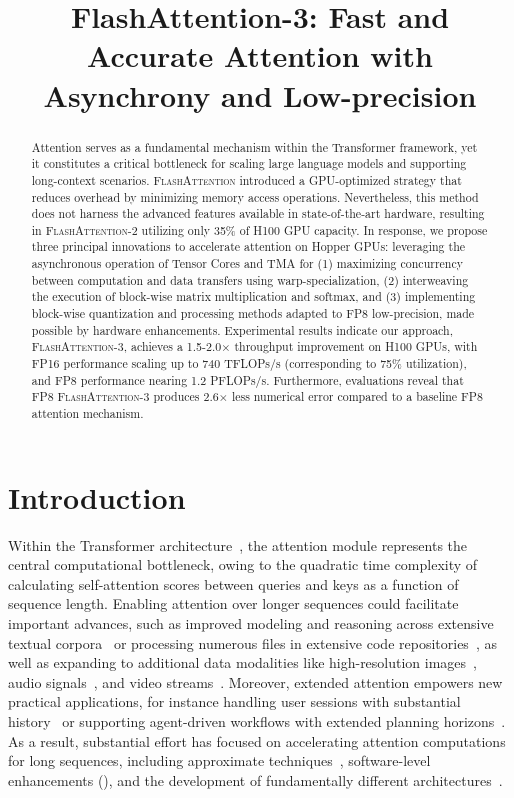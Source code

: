 \title{FlashAttention-3: Fast and Accurate Attention with Asynchrony and Low-precision}

\begin{abstract}
Attention serves as a fundamental mechanism within the Transformer framework, yet it constitutes a critical bottleneck for scaling large language models and supporting long-context scenarios. \textsc{FlashAttention} introduced a GPU-optimized strategy that reduces overhead by minimizing memory access operations. Nevertheless, this method does not harness the advanced features available in state-of-the-art hardware, resulting in \textsc{FlashAttention-2} utilizing only 35\% of H100 GPU capacity. In response, we propose three principal innovations to accelerate attention on Hopper GPUs: leveraging the asynchronous operation of Tensor Cores and TMA for (1) maximizing concurrency between computation and data transfers using warp-specialization, (2) interweaving the execution of block-wise matrix multiplication and softmax, and (3) implementing block-wise quantization and processing methods adapted to FP8 low-precision, made possible by hardware enhancements. Experimental results indicate our approach, \textsc{FlashAttention-3}, achieves a 1.5-2.0$\times$ throughput improvement on H100 GPUs, with FP16 performance scaling up to 740 TFLOPs/s (corresponding to 75\% utilization), and FP8 performance nearing 1.2 PFLOPs/s. Furthermore, evaluations reveal that FP8 \textsc{FlashAttention-3} produces 2.6$\times$ less numerical error compared to a baseline FP8 attention mechanism.
\end{abstract}

\section{Introduction}
\label{sec:intro}

Within the Transformer architecture~\citep{vaswani2017attention}, the attention module represents the central computational bottleneck, owing to the quadratic time complexity of calculating self-attention scores between queries and keys as a function of sequence length. Enabling attention over longer sequences could facilitate important advances, such as improved modeling and reasoning across extensive textual corpora~\citep{guo2021longt5,shaham2022scrolls,peng2023yarn} or processing numerous files in extensive code repositories~\citep{roziere2023code, li2023starcoder}, as well as expanding to additional data modalities like high-resolution images~\citep{chen2022scaling}, audio signals~\citep{gulati2020conformer}, and video streams~\citep{ho2022video}. Moreover, extended attention empowers new practical applications, for instance handling user sessions with substantial history~\citep{sun2019bert4rec} or supporting agent-driven workflows with extended planning horizons~\citep{yao2022react}. As a result, substantial effort has focused on accelerating attention computations for long sequences, including approximate techniques~\citep{katharopoulos2020transformers,choromanski2020rethinking,
tay2020efficient}, software-level enhancements (\citep{rabe2021self,dao2022flashattention,kwon2023efficient}), and the development of fundamentally different architectures~\citep{peng2023rwkv,sun2023retentive,gu2023mamba}.

